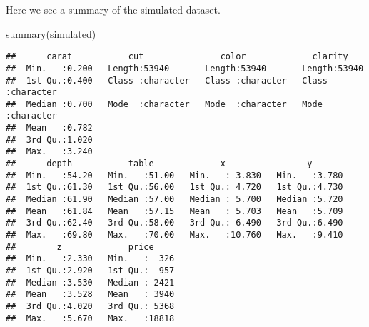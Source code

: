 \documentclass[
]{article}
\newenvironment{Shaded}{\begin{snugshade}}{\end{snugshade}}
\newcommand{\FunctionTok}[1]{\textcolor[rgb]{0.00,0.00,0.00}{#1}}
\newcommand{\NormalTok}[1]{#1}
\begin{document}
Here we see a summary of the simulated dataset.

\begin{Shaded}
\begin{Highlighting}[]
\FunctionTok{summary}\NormalTok{(simulated)}
\end{Highlighting}
\end{Shaded}

\begin{verbatim}
##      carat           cut               color             clarity         
##  Min.   :0.200   Length:53940       Length:53940       Length:53940      
##  1st Qu.:0.400   Class :character   Class :character   Class :character  
##  Median :0.700   Mode  :character   Mode  :character   Mode  :character  
##  Mean   :0.782                                                           
##  3rd Qu.:1.020                                                           
##  Max.   :3.240                                                           
##      depth           table             x                y        
##  Min.   :54.20   Min.   :51.00   Min.   : 3.830   Min.   :3.780  
##  1st Qu.:61.30   1st Qu.:56.00   1st Qu.: 4.720   1st Qu.:4.730  
##  Median :61.90   Median :57.00   Median : 5.700   Median :5.720  
##  Mean   :61.84   Mean   :57.15   Mean   : 5.703   Mean   :5.709  
##  3rd Qu.:62.40   3rd Qu.:58.00   3rd Qu.: 6.490   3rd Qu.:6.490  
##  Max.   :69.80   Max.   :70.00   Max.   :10.760   Max.   :9.410  
##        z             price      
##  Min.   :2.330   Min.   :  326  
##  1st Qu.:2.920   1st Qu.:  957  
##  Median :3.530   Median : 2421  
##  Mean   :3.528   Mean   : 3940  
##  3rd Qu.:4.020   3rd Qu.: 5368  
##  Max.   :5.670   Max.   :18818
\end{verbatim}
\end{document}
